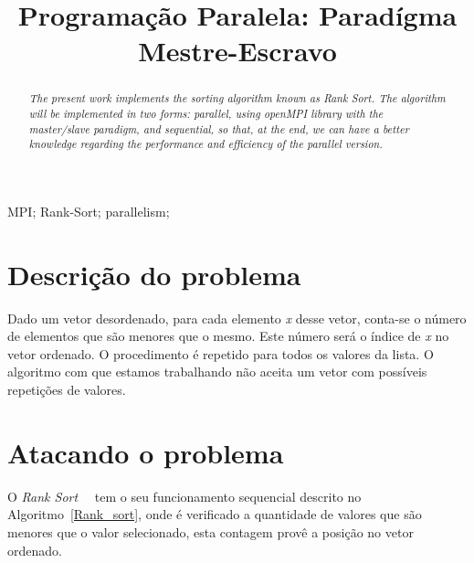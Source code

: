 \documentclass[portuguese, conference]{IEEEtran}
\begin{document}
\title{Programação Paralela: Paradígma Mestre-Escravo}

\author{
}

\maketitle

\begin{abstract}
\it{The present work implements the sorting algorithm known as Rank Sort. The algorithm will be implemented in two forms: parallel, using openMPI library with the master/slave paradigm, and sequential, so that, at the end, we can have a better knowledge regarding the performance and efficiency of the parallel version.}
\end{abstract}

\begin{IEEEkeywords}
MPI; Rank-Sort; parallelism;
\end{IEEEkeywords}

\IEEEpeerreviewmaketitle

\section{Descrição do problema}

Dado um vetor desordenado, para cada elemento \textit {x} desse vetor, conta-se o número de elementos que são menores que o mesmo. Este número será o índice de \textit{x} no vetor ordenado. O procedimento é repetido para todos os valores da lista. O algoritmo com que estamos trabalhando não aceita um vetor com possíveis repetições de valores.

\section{Atacando o problema}

O {\it Rank Sort}~\cite{JOH15}~\cite{BEA15} tem o seu funcionamento sequencial descrito no Algoritmo~\ref{Rank_sort}, onde é verificado a quantidade de valores que são menores que o valor selecionado, esta contagem provê a posição no vetor ordenado.
\end{document}
